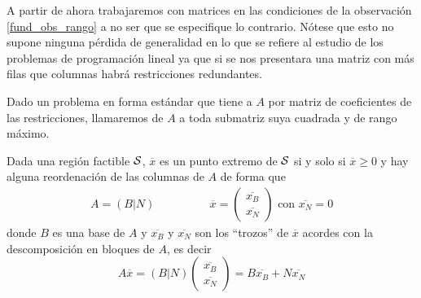 A partir de ahora trabajaremos con matrices en las condiciones de la observación \ref{fund_obs_rango} a no ser que se especifique lo contrario. Nótese que esto no supone ninguna pérdida de generalidad en lo que se refiere al estudio de los problemas de programación lineal ya que si se nos presentara una matriz con más filas que columnas habrá restricciones redundantes.
\begin{defi}[Bases]
	Dado un problema en forma estándar que tiene a $A$ por matriz de coeficientes de las restricciones, llamaremos  de $A$ a toda submatriz suya cuadrada y de rango máximo.
\end{defi}
\begin{theo}[Caracterización]
	\label{fund_teo_caracterizacionExtremos}
	Dada una región factible $\mathcal{S}$, $\overline{x}$ es un punto extremo de $\mathcal{S}$ si y solo si $\overline{x}\geq 0$ y hay alguna reordenación de las columnas de $A$ de forma que
	\begin{equation*}
	\begin{array}{ccc}
	A=(B|N) \qquad&\qquad \overline{x}=\begin{pmatrix}
	\overline{x_B}\\
	\overline{x_N}
	\end{pmatrix}\text{ con } \overline{x_N}=0
	\end{array}
	\end{equation*}
	donde $B$ es una base de $A$ y $\overline{x_B}$ y $\overline{x_N}$ son los ``trozos'' de $\overline{x}$ acordes con la descomposición en bloques de $A$, es decir
	\begin{equation*}
		A\overline{x}=(B|N)\begin{pmatrix}
		\overline{x_B}\\
		\overline{x_N}
		\end{pmatrix}=B\overline{x_B}+N\overline{x_N}
	\end{equation*}
\end{theo}
